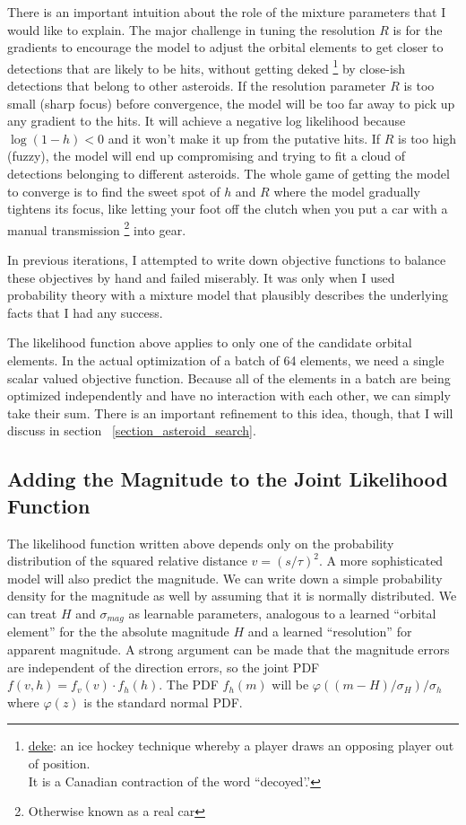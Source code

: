 There is an important intuition about the role of the mixture parameters that I would like to explain.
The major challenge in tuning the resolution $R$ is for the gradients to encourage the model to adjust the orbital elements
to get closer to detections that are likely to be hits, without getting deked 
\footnote{\href{https://en.wikipedia.org/wiki/Deke_(ice_hockey)}{deke}: an ice hockey technique whereby a player draws an opposing player out of position.\\
It is a Canadian contraction of the word ``decoyed'.'}
by close-ish detections that belong to other asteroids.
If the resolution parameter $R$ is too small (sharp focus) before convergence, the model will be too far away to pick up any gradient to the hits.
It will achieve a negative log likelihood because $\log(1-h) < 0$ and it won't make it up from the putative hits.
If $R$ is too high (fuzzy), the model will end up compromising and trying to fit a cloud of detections belonging to different asteroids.
The whole game of getting the model to converge is to find the sweet spot of $h$ and $R$ where the model gradually tightens its focus,
like letting your foot off the clutch when you put a car with a manual transmission \footnote{Otherwise known as a real car} into gear. 

In previous iterations, I attempted to write down objective functions to balance these objectives by hand and failed miserably.
It was only when I used probability theory with a mixture model that plausibly describes the underlying facts that I had any success.

The likelihood function above applies to only one of the candidate orbital elements.
In the actual optimization of a batch of 64 elements, we need a single scalar valued objective function.
Because all of the elements in a batch are being optimized independently and have no interaction with each other, we can simply take their sum.
There is an important refinement to this idea, though, that I will discuss in section ~\ref{section_asteroid_search}.

\subsection{Adding the Magnitude to the Joint Likelihood Function}
The likelihood function written above depends only on the probability distribution of the squared relative distance $v = (s/\tau)^2$.
A more sophisticated model will also predict the magnitude.
We can write down a simple probability density for the magnitude as well by assuming that it is normally distributed.
We can treat $H$ and $\sigma_{mag}$ as learnable parameters, analogous to a learned ``orbital element'' for the the absolute magnitude $H$
and a learned ``resolution'' for apparent magnitude.
A strong argument can be made that the magnitude errors are independent of the direction errors, 
so the joint PDF $f(v, h) = f_{v}(v) \cdot f_h(h)$.
The PDF $f_h(m)$ will be $\varphi( (m - H) / \sigma_H) / \sigma_h$ where $\varphi(z)$ is the standard normal PDF.

